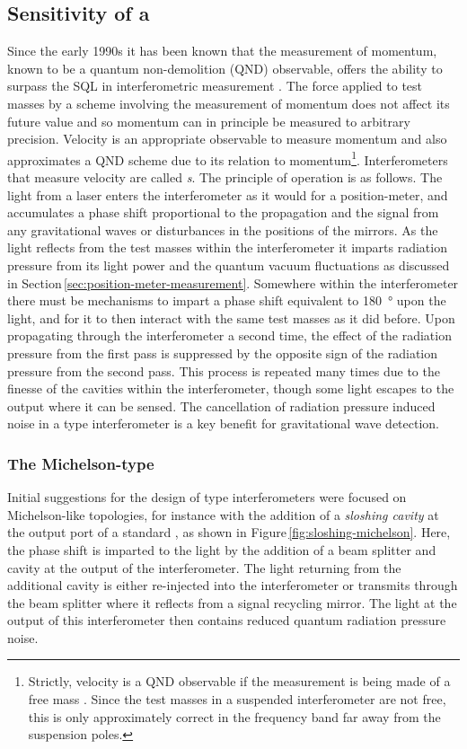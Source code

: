 \subsection{\label{sec:speed-meter-measurement}Sensitivity of a \SM{}}
Since the early 1990s it has been known that the measurement of momentum, known to be a quantum non-demolition (\gls{QND}) observable, offers the ability to surpass the \gls{SQL} in interferometric measurement \cite{Braginsky1990}. The force applied to test masses by a scheme involving the measurement of momentum does not affect its future value and so momentum can in principle be measured to arbitrary precision. Velocity is an appropriate observable to measure momentum and also approximates a \gls{QND} scheme due to its relation to momentum\footnote{Strictly, velocity is a \gls{QND} observable if the measurement is being made of a free mass \cite{Danilishin2012}. Since the test masses in a suspended interferometer are not free, this is only approximately correct in the frequency band far away from the suspension poles.}. Interferometers that measure velocity are called \emph{\SM{}s}. The principle of operation is as follows. The light from a laser enters the interferometer as it would for a position-meter, and accumulates a phase shift proportional to the propagation and the signal from any gravitational waves or disturbances in the positions of the mirrors. As the light reflects from the test masses within the interferometer it imparts radiation pressure from its light power and the quantum vacuum fluctuations as discussed in Section\,\ref{sec:position-meter-measurement}. Somewhere within the interferometer there must be mechanisms to impart a phase shift equivalent to \SI{180}{\degree} upon the light, and for it to then interact with the same test masses as it did before. Upon propagating through the interferometer a second time, the effect of the radiation pressure from the first pass is suppressed by the opposite sign of the radiation pressure from the second pass. This process is repeated many times due to the finesse of the cavities within the interferometer, though some light escapes to the output where it can be sensed. The cancellation of radiation pressure induced noise in a \SM{} type interferometer is a key benefit for gravitational wave detection.

\subsubsection{The Michelson-type \SM{}}
Initial suggestions for the design of \SM{} type interferometers were focused on Michelson-like topologies, for instance with the addition of a \emph{sloshing cavity} \cite{Braginsky2000, Purdue2002} at the output port of a standard \FPMI{}, as shown in Figure\,\ref{fig:sloshing-michelson}. Here, the phase shift is imparted to the light by the addition of a beam splitter and cavity at the output of the interferometer. The light returning from the additional cavity is either re-injected into the interferometer or transmits through the beam splitter where it reflects from a signal recycling mirror. The light at the output of this interferometer then contains reduced quantum radiation pressure noise.

